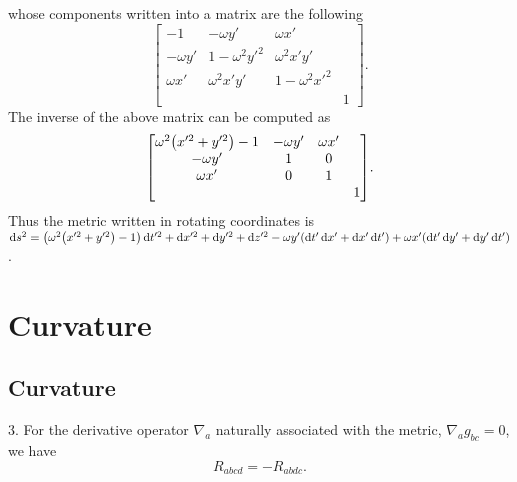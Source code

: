 \documentclass{note}
\numberwithin{equation}{chapter}
\newcommand{\diff}{\operatorname{d}\!}
\begin{document}
whose components written into a matrix are the following
\begin{equation*}
    \begin{bmatrix}
        -1         & -\omega y'     & \omega x'          \\
        -\omega y' & 1-\omega^2y'^2 & \omega^2x'y'       \\
        \omega x'  & \omega^2x'y'   & 1-\omega^2x'^2     \\
                   &                &                & 1
    \end{bmatrix}.
\end{equation*}
The inverse of the above matrix can be computed as
\begin{equation*}
    \begin{bmatrix}
        \omega^2\prn{x'^2+y'^2}-1 & -\omega y' & \omega x'     \\
        -\omega y'                & 1          & 0             \\
        \omega x'                 & 0          & 1             \\
                                  &            &           & 1
    \end{bmatrix}.
\end{equation*}
Thus the metric written in rotating coordinates is $\diff s^2 =
    \prn{\omega^2\prn{x'^2+y'^2}-1}\diff t'^2 + \diff x'^2 + \diff y'^2 + \diff
    z'^2 - \omega y'(\diff t'\diff x' + \diff x'\diff t') + \omega x' (\diff
    t'\diff y' + \diff y'\diff t')$.

\chapter{Curvature}

\setcounter{section}{1}

\section{Curvature}


\begin{quotebox}
    3. For the derivative operator $\nabla_a$ naturally associated with the
    metric, $\nabla_ag_{bc}=0$, we have
    \begin{equation*}
        R_{abcd} = - R_{abdc}.
    \end{equation*}
\end{quotebox}
\end{document}
